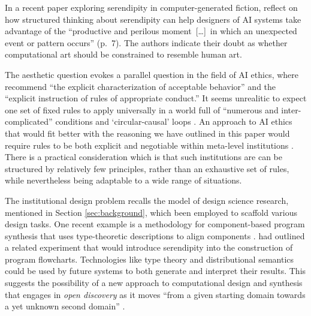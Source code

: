 In a recent paper exploring serendipity in computer-generated fiction,
\citet{mccallum2018} reflect on how structured thinking about
serendipity can help designers of AI systems take advantage of the
``productive and perilous moment~[\ldots]~in which an unexpected event
or pattern occurs'' (p.~7).  The authors indicate their doubt as
whether computational art should be constrained to resemble human art.

The aesthetic question evokes a parallel question in the field of AI
ethics, where \citet{caliskan2017semantics} recommend ``the explicit
characterization of acceptable behavior'' and the ``explicit
instruction of rules of appropriate conduct.''  It seems unrealitic to
expect one set of fixed rules to apply universally in a world full of
``numerous and inter-complicated'' conditions \cite[p.~710]{lovelace}
and `circular-causal' loops \cite{loughran2018serendipity}.  An
approach to AI ethics that would fit better with the reasoning we have
outlined in this paper would require rules to be both explicit and
negotiable within meta-level institutions
\cite{corneli2016institutional}.  There is a practical consideration
which is that such institutions are can be structured by relatively
few principles, rather than an exhaustive set of rules, while
nevertheless being adaptable to a wide range of situations.

The institutional design problem recalls the model of design science
research, mentioned in Section \ref{sec:background}, which been
employed to scaffold various design tasks.  One recent example is a
methodology for component-based program synthesis that uses
type-theoretic descriptions to align components
\cite{10.1007/978-3-030-03427-6_35}.  \citet{pease2013discussion} had
outlined a related experiment that would introduce serendipity into
the construction of program flowcharts.  Technologies like type theory
and distributional semantics \cite{DBLP:journals/corr/abs-1803-09473}
could be used by future systems to both generate and interpret their
results.  This suggests the possibility of a new approach to
computational design and synthesis that engages in \emph{open
  discovery} as it moves ``from a given starting domain towards a yet
unknown second domain'' \cite{jurvsivc2012cross}.

